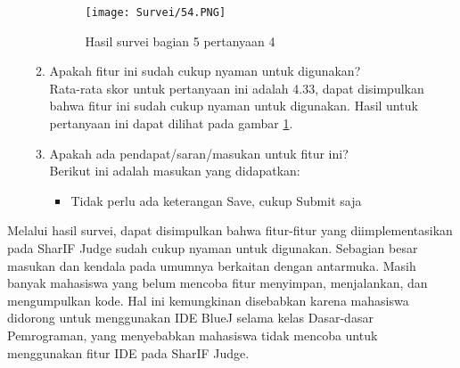 \begin{enumerate}
\begin{enumerate}
\begin{itemize}
        \end{itemize}
        \begin{figure}[H]
        	\centering  
        	\texttt{[image: Survei/54.PNG]}  
        	\caption{Hasil survei bagian 5 pertanyaan 4}
        	\label{fig:5:survei54} 
        \end{figure}
        \item Apakah fitur ini sudah cukup nyaman untuk digunakan? \\ Rata-rata skor untuk pertanyaan ini adalah 4.33, dapat disimpulkan bahwa fitur ini sudah cukup nyaman untuk digunakan. Hasil untuk pertanyaan ini dapat dilihat pada gambar \ref{fig:5:survei54}.
        \item Apakah ada pendapat/saran/masukan untuk fitur ini? \\ Berikut ini adalah masukan yang didapatkan:
        \begin{itemize}
            \item Tidak perlu ada keterangan Save, cukup Submit saja
        \end{itemize}
    \end{enumerate}
\end{enumerate}

Melalui hasil survei, dapat disimpulkan bahwa fitur-fitur yang diimplementasikan pada SharIF Judge sudah cukup nyaman untuk digunakan. Sebagian besar masukan dan kendala pada umumnya berkaitan dengan antarmuka. Masih banyak mahasiswa yang belum mencoba fitur menyimpan, menjalankan, dan mengumpulkan kode. Hal ini kemungkinan disebabkan karena mahasiswa didorong untuk menggunakan IDE BlueJ selama kelas Dasar-dasar Pemrograman, yang menyebabkan mahasiswa tidak mencoba untuk menggunakan fitur IDE pada SharIF Judge.